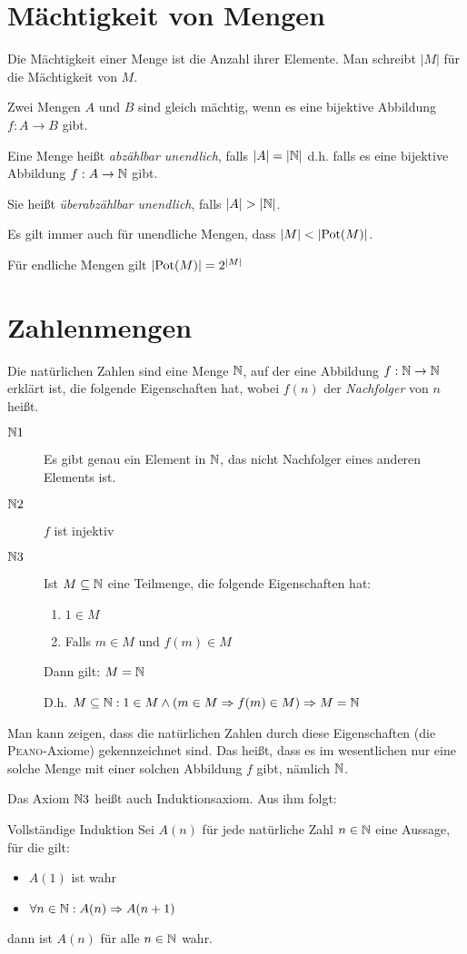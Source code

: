 \section{Mächtigkeit von Mengen}
Die Mächtigkeit einer Menge ist die Anzahl ihrer Elemente. Man schreibt $|M|$ für die Mächtigkeit von $M$.

Zwei Mengen $A$ und $B$ sind gleich mächtig, wenn es eine bijektive Abbildung $f:A\rightarrow B$ gibt.

Eine Menge heißt \emph{abzählbar unendlich}, falls $|A|=|\mathbb{N}|$ d.h. falls es eine bijektive Abbildung $f:A\rightarrow \mathbb{N}$ gibt.

Sie heißt \emph{überabzählbar unendlich}, falls $|A|>|\N|$.

Es gilt immer auch für unendliche Mengen, dass $|M| < |\mathrm{Pot}(M)|$.

Für endliche Mengen gilt $|\mathrm{Pot}(M)| = 2^{|M|}$



\section{Zahlenmengen}
Die natürlichen Zahlen sind eine Menge $\mathbb{N}$, auf der eine Abbildung $f:\mathbb{N}\rightarrow\mathbb{N}$ erklärt ist, die folgende Eigenschaften hat, wobei $f(n)$ der \emph{Nachfolger} von $n$ heißt.
\begin{description}
  \item[$\mathbb{N} 1$] Es gibt genau ein Element in $\mathbb{N}$, das nicht Nachfolger eines anderen Elements ist.
  \item[$\mathbb{N} 2$] $f$ ist injektiv
  \item[$\mathbb{N} 3$] Ist $M\subseteq \mathbb{N}$ eine Teilmenge, die folgende Eigenschaften hat:
  \begin{enumerate}
    \item $1\in M$
    \item Falls $m\in M$ und $f(m)\in M$
  \end{enumerate}
  Dann gilt: $M = \mathbb{N}$

  D.h. $M\subseteq \mathbb{N} : 1\in M \wedge (m\in M \Rightarrow f(m)\in M) \Rightarrow M=\mathbb{N}$
\end{description}

Man kann zeigen, dass die natürlichen Zahlen durch diese Eigenschaften (die \textsc{Peano}-Axiome) gekennzeichnet sind. Das heißt, dass es im wesentlichen nur eine solche Menge mit einer solchen Abbildung $f$ gibt, nämlich $\mathbb{N}$.

Das Axiom $\mathbb{N} 3$ heißt auch Induktionsaxiom. Aus ihm folgt:

\begin{satz}{Vollständige Induktion}
  Sei $A(n)$ für jede natürliche Zahl $n \in\mathbb{N}$ eine Aussage, für die gilt:
  \begin{itemize}
    \item $A(1)$ ist wahr
    \item $\forall n\in\mathbb{N} : A(n) \Rightarrow A(n+1)$
  \end{itemize}
  dann ist $A(n)$ für alle $n\in\mathbb{N}$ wahr.
\end{satz}
